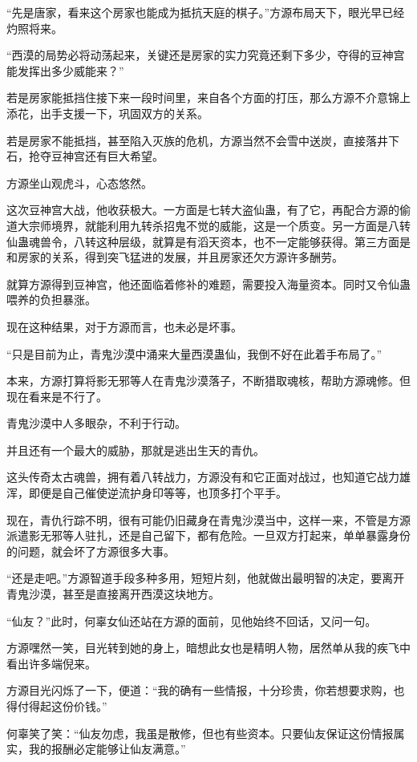 \begin{this_body}
“先是唐家，看来这个房家也能成为抵抗天庭的棋子。”方源布局天下，眼光早已经灼照将来。

“西漠的局势必将动荡起来，关键还是房家的实力究竟还剩下多少，夺得的豆神宫能发挥出多少威能来？”

若是房家能抵挡住接下来一段时间里，来自各个方面的打压，那么方源不介意锦上添花，出手支援一下，巩固双方的关系。

若是房家不能抵挡，甚至陷入灭族的危机，方源当然不会雪中送炭，直接落井下石，抢夺豆神宫还有巨大希望。

方源坐山观虎斗，心态悠然。

这次豆神宫大战，他收获极大。一方面是七转大盗仙蛊，有了它，再配合方源的偷道大宗师境界，就能利用九转杀招鬼不觉的威能，这是一个质变。另一方面是八转仙蛊魂兽令，八转这种层级，就算是有滔天资本，也不一定能够获得。第三方面是和房家的关系，得到突飞猛进的发展，并且房家还欠方源许多酬劳。

就算方源得到豆神宫，他还面临着修补的难题，需要投入海量资本。同时又令仙蛊喂养的负担暴涨。

现在这种结果，对于方源而言，也未必是坏事。

“只是目前为止，青鬼沙漠中涌来大量西漠蛊仙，我倒不好在此着手布局了。”

本来，方源打算将影无邪等人在青鬼沙漠落子，不断猎取魂核，帮助方源魂修。但现在看来是不行了。

青鬼沙漠中人多眼杂，不利于行动。

并且还有一个最大的威胁，那就是逃出生天的青仇。

这头传奇太古魂兽，拥有着八转战力，方源没有和它正面对战过，也知道它战力雄浑，即便是自己催使逆流护身印等等，也顶多打个平手。

现在，青仇行踪不明，很有可能仍旧藏身在青鬼沙漠当中，这样一来，不管是方源派遣影无邪等人驻扎，还是自己留下，都有危险。一旦双方打起来，单单暴露身份的问题，就会坏了方源很多大事。

“还是走吧。”方源智道手段多种多用，短短片刻，他就做出最明智的决定，要离开青鬼沙漠，甚至是直接离开西漠这块地方。

“仙友？”此时，何辜女仙还站在方源的面前，见他始终不回话，又问一句。

方源嘿然一笑，目光转到她的身上，暗想此女也是精明人物，居然单从我的疾飞中看出许多端倪来。

方源目光闪烁了一下，便道：“我的确有一些情报，十分珍贵，你若想要求购，也得付得起这份价钱。”

何辜笑了笑：“仙友勿虑，我虽是散修，但也有些资本。只要仙友保证这份情报属实，我的报酬必定能够让仙友满意。”


\end{this_body}
